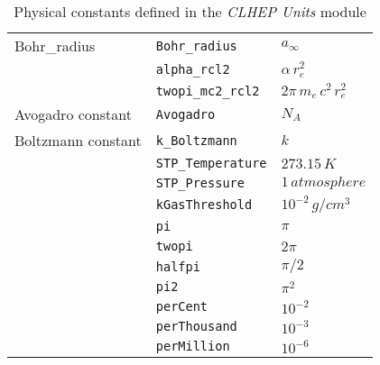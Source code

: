 \documentclass{article}
\begin{document}
\begin{table}
\begin{tabular}{|l|l|l|}
Bohr\_{}radius            &{\tt Bohr\_{}radius}  &$ a_\infty               $\\
                          &{\tt alpha\_{}rcl2}   &$ \alpha\,r_e^2          $\\
                          &{\tt twopi\_{}mc2\_{}rcl2}&$ 2\pi\,m_e\,c^2\,r_e^2$\\
Avogadro constant         &{\tt Avogadro}        &$ N_A                    $\\
Boltzmann constant        &{\tt k\_Boltzmann}    &$ k                      $\\
                          &{\tt STP\_{}Temperature}&$ 273.15\,K            $\\
                          &{\tt STP\_{}Pressure} &$ 1\,atmosphere          $\\
                          &{\tt kGasThreshold}   &$ 10^{-2}\,g/cm^3        $\\
\hline
                          &{\tt pi}              &$ \pi                    $\\
                          &{\tt twopi}           &$ 2\pi                   $\\
                          &{\tt halfpi}          &$ \pi/2                  $\\
                          &{\tt pi2}             &$ \pi^2                  $\\
                          &{\tt perCent}         &$ 10^{-2}                $\\
                          &{\tt perThousand}     &$ 10^{-3}                $\\
                          &{\tt perMillion}      &$ 10^{-6}                $\\
\hline 
\end {tabular}
\caption{Physical constants defined in the {\it CLHEP Units} module}
\label{tab2}
\end{table}
\end{document}
